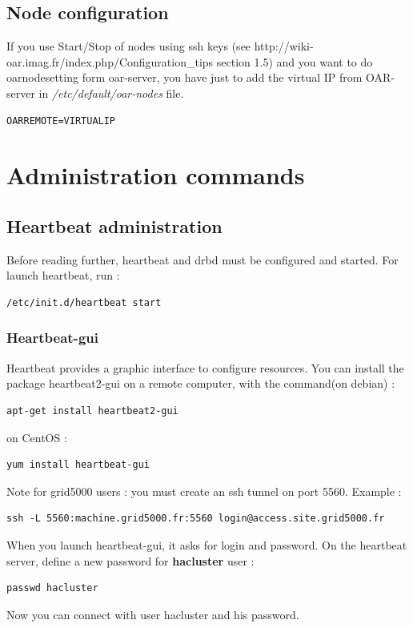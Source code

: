 \documentclass[a4paper,10pt]{report}
\begin{document}
\subsection{Node configuration}
\label{nodeconf}
If you use Start/Stop of nodes using ssh keys (see http://wiki-oar.imag.fr/index.php/Configuration\_tips section 1.5) and you want to do oarnodesetting form oar-server, 
you have just to add the virtual IP from OAR-server in \textit{/etc/default/oar-nodes} file.
\begin{lstlisting}
OARREMOTE=VIRTUALIP
\end{lstlisting}

\section{Administration commands}

\subsection{Heartbeat administration}

Before reading further, heartbeat and drbd must be configured and started. For launch heartbeat, run :
\begin{lstlisting}
/etc/init.d/heartbeat start
\end{lstlisting}


\subsubsection{Heartbeat-gui}


Heartbeat provides a graphic interface to configure resources. You can install the package heartbeat2-gui on a remote computer, with the command(on debian) :
\begin{lstlisting}
apt-get install heartbeat2-gui
\end{lstlisting}
on CentOS :
\begin{lstlisting}
yum install heartbeat-gui
\end{lstlisting}
Note for grid5000 users : you must create an ssh tunnel on port 5560. Example :
\begin{lstlisting}
ssh -L 5560:machine.grid5000.fr:5560 login@access.site.grid5000.fr
\end{lstlisting}
When you launch heartbeat-gui, it asks for login and password. On the heartbeat server, define a new password for \textbf{hacluster} user :
\begin{lstlisting}
passwd hacluster
\end{lstlisting}
Now you can connect with user hacluster and his password.\\
\end{document}
